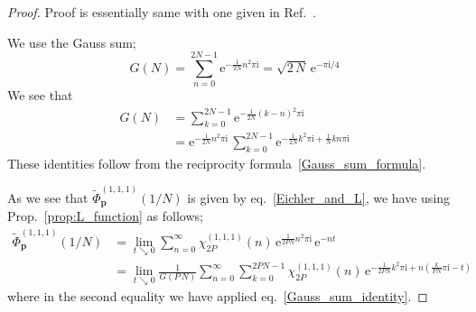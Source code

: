 \documentclass[12pt,reqno]{amsart}
\numberwithin{equation}{section}
\begin{document}
\begin{proof}
  Proof is essentially same with one given in Ref.~.

  We use the Gauss sum;
  \begin{equation}
    \label{Gauss_sum}
    G(N)=
    \sum_{n=0}^{2  N -1}
    \mathrm{e}^{- \frac{1}{2  N} n^2 \pi \mathrm{i}}
    =
    \sqrt{2 \,  N} \,
    \mathrm{e}^{-\pi \mathrm{i}/4}
  \end{equation}
  We see that
  \begin{align}
    G(N) &=
    \sum_{k=0}^{2  N-1} \mathrm{e}^{
      -\frac{1}{2  N} (k-n)^2 \pi \mathrm{i}
    }
    \nonumber
    \\
    & =
    \mathrm{e}^{-\frac{1}{2  N} n^2 \pi \mathrm{i}} \,
    \sum_{k=0}^{2  N-1}
    \mathrm{e}^{-\frac{1}{2  N} k^2 \pi \mathrm{i}
      + \frac{1}{ N} k n \pi \mathrm{i}
    }
    \label{Gauss_sum_identity}
  \end{align}
  These identities follow from the reciprocity
  formula~\eqref{Gauss_sum_formula}.


  As we see that $\widetilde{\Phi}_{\boldsymbol{p}}^{(1,1,1)}(1/N)$
  is given by eq.~\eqref{Eichler_and_L},
  we have using Prop.~\ref{prop:L_function}
  as follows;
  \begin{align*}
    \widetilde{\Phi}_{\boldsymbol{p}}^{(1,1,1)}(1/N)
    & =
    \lim_{t \searrow 0} \sum_{n=0}^\infty
    \chi_{2 P}^{(1,1,1)}(n) \,
    \mathrm{e}^{\frac{1}{2 P N} n^2 \pi \mathrm{i}}  \,
    \mathrm{e}^{- n t}
    \\
    & =
    \lim_{t \searrow 0}
    \frac{1}{G(P \, N)}
    \sum_{n=0}^\infty \sum_{k=0}^{2 P N-1}
    \chi_{2 P}^{(1,1,1)}(n) \,
    \mathrm{e}^{
      -\frac{1}{2 P N} k^2 \pi \mathrm{i} 
      +
      n \left(
        \frac{k}{P N} \pi \mathrm{i} - t
      \right)
    }
  \end{align*}
  where in the second equality we have applied
  eq.~\eqref{Gauss_sum_identity}.


\end{proof}
\end{document}
